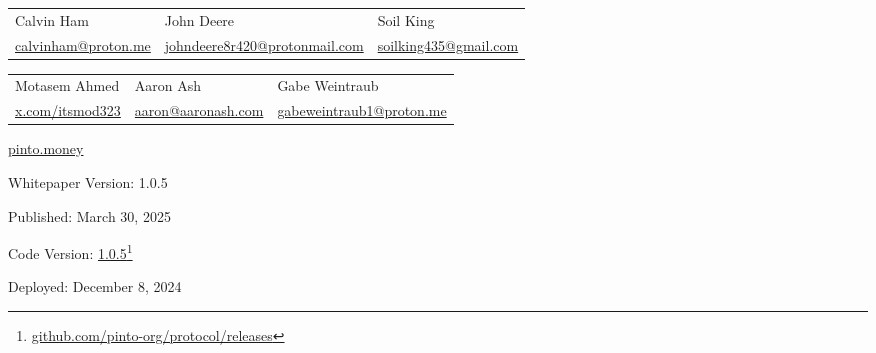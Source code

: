 \documentclass[tikz]{article}
\begin{document}
\begin{titlepage}
\begin{center}
        \vspace*{-0.52cm}

        \begin{center}
            \begin{tabular}{>{\centering\arraybackslash}p{4.6cm} >{\centering\arraybackslash}p{4.6cm} >{\centering\arraybackslash}p{4.6cm}}
                Calvin Ham & John Deere & Soil King \\
                 \href{mailto:calvinham@proton.me}{\normalsize{calvinham@proton.me}} & \href{mailto:johndeere8r420@protonmail.com}{\normalsize{johndeere8r420@protonmail.com}} & \href{mailto:soilking435@gmail.com}{\normalsize{soilking435@gmail.com}}
            \end{tabular}
        \end{center}

        \vspace*{-0.52cm}

        \begin{center}
            \begin{tabular}{>{\centering\arraybackslash}p{4.6cm} >{\centering\arraybackslash}p{4.6cm} >{\centering\arraybackslash}p{4.6cm}}
                Motasem Ahmed & Aaron Ash & Gabe Weintraub \\
                \href{https://x.com/itsmod323}{\normalsize{x.com/itsmod323}} & \href{mailto:aaron@aaronash.com}{\normalsize{aaron@aaronash.com}} & \href{mailto:gabeweintraub1@proton.me}{\normalsize{gabeweintraub1@proton.me}}
            \end{tabular}
        \end{center}


        \normalsize{\href{https://pinto.money/}{pinto.money}}

        \footnotesize{Whitepaper Version:} {\normalsize{1.0.5}}

        \vspace{-0.25cm}
        \footnotesize{Published:} {\normalsize{March 30, 2025}}

        \vspace{-0.25cm}
        \footnotesize{Code Version:} \href{https://github.com/pinto-org/protocol/releases}{\normalsize{1.0.5}}\footnote{\href{https://github.com/pinto-org/protocol/releases}{github.com/pinto-org/protocol/releases}}

        \vspace{-0.25cm}
        \footnotesize{Deployed:} {\normalsize{December 8, 2024}}
        

\end{center}
\end{titlepage}
\end{document}

